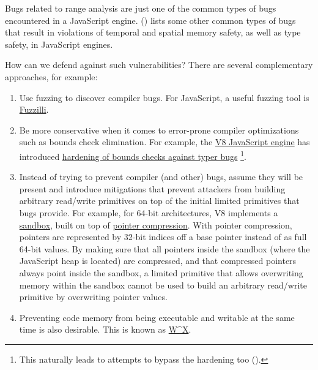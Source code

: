 \documentclass[
  a4paper,
]{report}
\providecommand{\tightlist}{%
  \setlength{\itemsep}{0pt}\setlength{\parskip}{0pt}}
\begin{document}
Bugs related to range analysis are just one of the common types of bugs
encountered in a JavaScript engine. () lists some other common types of bugs that result in
violations of temporal and spatial memory safety, as well as type
safety, in JavaScript engines.

How can we defend against such vulnerabilities? There are several
complementary approaches, for example:

\begin{enumerate}
\def\labelenumi{\arabic{enumi}.}
\tightlist
\item
  Use fuzzing to discover compiler bugs. For JavaScript, a useful
  fuzzing tool is
  \href{https://github.com/googleprojectzero/fuzzilli}{Fuzzilli}.
\item
  Be more conservative when it comes to error-prone compiler
  optimizations such as bounds check elimination. For example, the
  \href{https://v8.dev/}{V8 JavaScript engine} has introduced
  \href{https://bugs.chromium.org/p/v8/issues/detail?id=8806}{hardening
  of bounds checks against typer bugs} \footnote{This naturally leads to
    attempts to bypass the hardening too
    ().}.
\item
  Instead of trying to prevent compiler (and other) bugs, assume they
  will be present and introduce mitigations that prevent attackers from
  building arbitrary read/write primitives on top of the initial limited
  primitives that bugs provide. For example, for 64-bit architectures,
  V8 implements a
  \href{https://docs.google.com/document/d/1FM4fQmIhEqPG8uGp5o9A-mnPB5BOeScZYpkHjo0KKA8/edit}{sandbox},
  built on top of
  \href{https://v8.dev/blog/pointer-compression}{\label{__index_entry_98}{pointer
  compression}}. With pointer compression,
  pointers are represented by 32-bit indices off a base pointer instead
  of as full 64-bit values. By making sure that all pointers inside the
  sandbox (where the JavaScript heap is located) are compressed, and
  that compressed pointers always point inside the sandbox, a limited
  primitive that allows overwriting memory within the sandbox cannot be
  used to build an arbitrary read/write primitive by overwriting pointer
  values.
\item
  Preventing code memory from being executable and writable at the same
  time is also desirable. This is known as
  \href{https://en.wikipedia.org/wiki/W\%5EX}{\label{__index_entry_99}{W\^{}X}}.

\end{enumerate}
\end{document}

